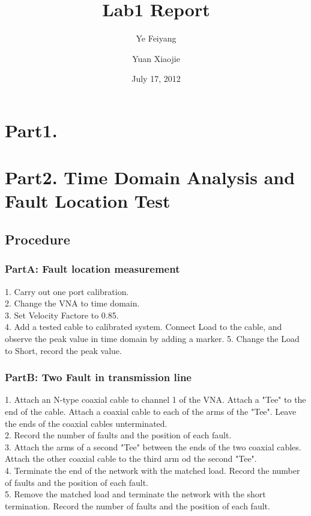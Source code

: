 \documentclass[11pt,oneside,a4paper]{report}
\begin{document}
\title{Lab1 Report}
\author{Ye Feiyang \and Yuan Xiaojie}
\date{July 17, 2012}
\maketitle

\chapter*{Part1. }

\chapter*{Part2. Time Domain Analysis and Fault Location Test}

\section*{Procedure}
\subsection*{PartA: Fault location measurement}
1. Carry out one port calibration.\\
2. Change the VNA to time domain.\\
3. Set Velocity Factore to 0.85.\\
4. Add a tested cable to calibrated system. Connect Load to the cable, and observe the peak value in time domain by adding a marker.
5. Change the Load to Short, record the peak value.
\subsection*{PartB: Two Fault in transmission line}
1. Attach an N-type coaxial cable to channel 1 of the VNA. Attach a "Tee" to the end of the cable. Attach a coaxial cable to each of the arms of the "Tee". Leave the ends of the coaxial cables unterminated.\\
2. Record the number of faults and the position of each fault.\\
3. Attach the arms of a second "Tee" between the ends of the two coaxial cables. Attach the other coaxial cable to the third arm od the second "Tee".\\
4. Terminate the end of the network with the matched load. Record the number of faults and the position of each fault.\\
5. Remove the matched load and terminate the network with the short termination. Record the number of faults and the position of each fault.
\end{document}
